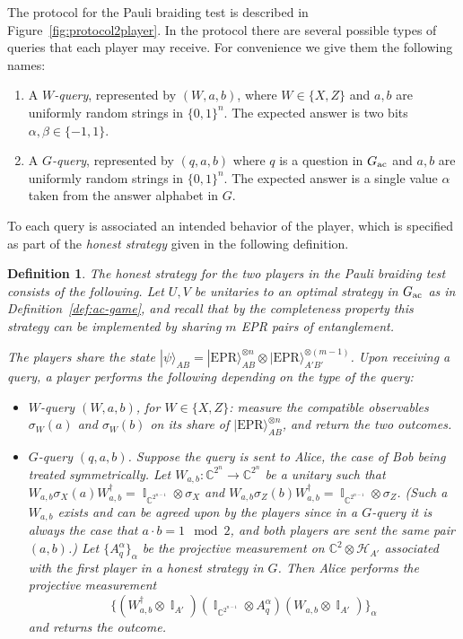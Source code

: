 \documentclass[11pt,letterpaper]{article}
\newcommand{\<}{\langle}
\renewcommand{\>}{\rangle}
\newtheorem{definition}[theorem]{Definition}
\newcommand{\ket}[1]{| #1 \>}
\newcommand{\mH}{\mathcal{H}}
\DeclareMathOperator{\Id}{\mathbb{I}}
\newcommand{\ac}{{\ensuremath{\rm ac}}}
\newcommand{\C}{\mathbb{C}}
\newcommand{\EPR}{\mathrm{EPR}}
\begin{document}
The protocol for the Pauli braiding test is described in Figure~\ref{fig:protocol2player}. In the protocol there are several possible types of queries that each player may receive. For convenience we give them the following names: 
\begin{enumerate}
\item A \emph{$W$-query}, represented by $(W, a, b)$, where $W\in\{X,Z\}$ and $a, b $ are uniformly random strings in $\{0,
  1\}^n$. The expected answer is two bits $\alpha,\beta\in\{-1,1\}$. 
\item A \emph{$G$-query}, represented by $(q, a, b)$ where
  $q$ is a question in $G_\ac$ and $a,b$ are uniformly random strings in $\{0,1\}^n$. The expected answer is a single value $\alpha$ taken from the answer alphabet in $G$. 
\end{enumerate}

To each query is associated an intended behavior of the player, which is specified as part of the \emph{honest strategy} given in the following definition. 

\begin{definition}\label{def:honest-strategy}
The \emph{honest strategy} for the two players in the Pauli braiding test consists of the following. Let $U,V$ be unitaries to an optimal strategy in $G_\ac$ as in Definition~\ref{def:ac-game}, and recall that by the completeness property this strategy can be implemented by sharing $m$ EPR pairs of entanglement. 

The players share the state $\ket{\psi}_{AB} = \ket{\EPR}^{\otimes n}_{AB} \otimes \ket{\EPR}^{\otimes (m-1)}_{A'B'}$.
Upon receiving a query, a player performs the following depending on the type of the query:
\begin{itemize}
\item $W$-query $(W,a,b)$, for $W\in\{X,Z\}$: measure the
  compatible observables $\sigma_W(a)$ and $\sigma_W(b)$ on its share of $\ket{\EPR}^{\otimes n}_{AB}$, and return the two outcomes. 
	\item $G$-query $(q,a,b)$. Suppose the query is sent to Alice, the case of Bob
    being treated symmetrically. Let $W_{a,b}:\C^{2^n}\to\C^{2^n}$ be a unitary such that $W_{a,b}\sigma_X(a)W_{a,b}^\dagger = \Id_{\C^{2^{n-1}}} \otimes \sigma_X$ and $W_{a,b}\sigma_Z(b)W_{a,b}^\dagger = \Id_{\C^{2^{n-1}}} \otimes \sigma_Z$. (Such a $W_{a,b}$ exists and can be agreed upon by the players since in a $G$-query it is always the case that $a\cdot b=1\mod 2$, and both players are sent the same pair $(a,b)$.) Let $\{A_q^\alpha\}_\alpha$  be the projective measurement on $\C^2 \otimes \mH_{A'}$ associated with the first player in a honest strategy in $G$. Then Alice performs the projective measurement 
	$$\big\{(W_{a,b}^\dagger\otimes \Id_{A'})(\Id_{\C^{2^{n-1}}} \otimes A_q^\alpha )(W_{a,b}\otimes \Id_{{A'}})\big\}_\alpha$$
	and returns the outcome. 
\end{itemize}
\end{definition}
\end{document}
